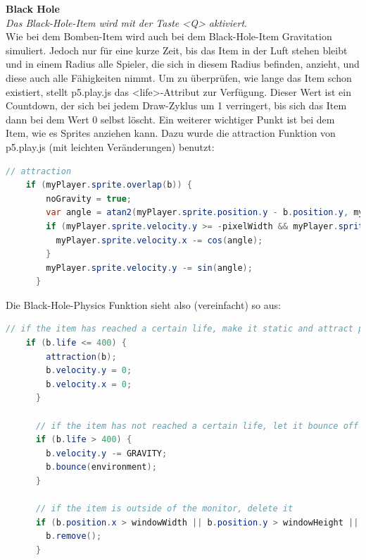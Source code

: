 \textbf{Black Hole}
\\
\textit{Das Black-Hole-Item wird mit der Taste <Q> aktiviert}.
\\
Wie bei dem Bomben-Item wird auch bei dem Black-Hole-Item Gravitation simuliert. Jedoch nur für eine kurze Zeit, bis das Item in der Luft stehen bleibt und in einem Radius alle Spieler, die sich in diesem Radius befinden, anzieht, und diese auch alle Fähigkeiten nimmt.
Um zu überprüfen, wie lange das Item schon existiert, stellt p5.play.js das <life>-Attribut zur Verfügung. Dieser Wert ist ein Countdown, der sich bei jedem Draw-Zyklus um 1 verringert, bis sich das Item dann bei dem Wert 0 selbst löscht.
Ein weiterer wichtiger Punkt ist bei dem Item, wie es Sprites anziehen kann. Dazu wurde die attraction Funktion von p5.play.js (mit leichten Veränderungen) benutzt:

\begin{lstlisting}[caption=Attraction,language=Java,label=lst:impl:attraction]
    // attraction
    if (myPlayer.sprite.overlap(b)) {
        noGravity = true;
        var angle = atan2(myPlayer.sprite.position.y - b.position.y, myPlayer.sprite.position.x - b.position.x);
        if (myPlayer.sprite.velocity.y >= -pixelWidth && myPlayer.sprite.velocity.y <= pixelWidth) {
          myPlayer.sprite.velocity.x -= cos(angle);
        }
        myPlayer.sprite.velocity.y -= sin(angle);
      }

\end{lstlisting}

Die Black-Hole-Physics Funktion sieht also (vereinfacht) so aus:
\\
\begin{lstlisting}[caption=Black Hole Item Physics,language=Java,label=lst:impl:bombGravity]
    // if the item has reached a certain life, make it static and attract players
    if (b.life <= 400) {
        attraction(b);
        b.velocity.y = 0;
        b.velocity.x = 0;
      }

      // if the item has not reached a certain life, let it bounce off the environment
      if (b.life > 400) {
        b.velocity.y -= GRAVITY;
        b.bounce(environment);
      }

      // if the item is outside of the monitor, delete it
      if (b.position.x > windowWidth || b.position.y > windowHeight || b.life == 0) {
        b.remove();
      }

\end{lstlisting}

